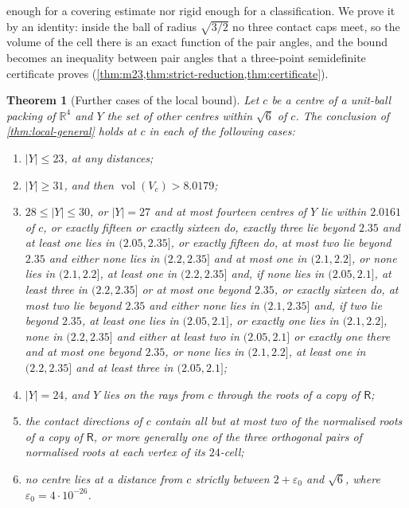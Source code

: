 \documentclass[11pt,reqno]{amsart}
\renewcommand{\_}{\origunderscore\allowbreak}
\numberwithin{equation}{section}
\theoremstyle{plain}
\newtheorem{thm}{Theorem}[section]
\theoremstyle{definition}
\theoremstyle{remark}
\newcommand{\Rt}{\mathsf{R}}                 %
\DeclareMathOperator{\vol}{vol}
\begin{document}
enough for a covering estimate nor rigid enough for a classification. We
prove it by an identity: inside the ball of radius $\sqrt{3/2}$ no three
contact caps meet, so the volume of the cell there is an exact function
of the pair angles, and the bound becomes an inequality between pair
angles that a three-point semidefinite certificate proves
(\cref{thm:m23,thm:strict-reduction,thm:certificate}).

\begin{thm}[Further cases of the local bound]\label{thm:intro-closure}
Let $c$ be a centre of a unit-ball packing of $\mathbb{R}^4$ and $Y$ the
set of other centres within $\sqrt6$ of $c$. The conclusion of
\cref{thm:local-general} holds at $c$ in each of the following cases:
\begin{enumerate}[label=\textup{(\alph*)},leftmargin=2.2em]
\item $|Y|\le23$, at any distances;
\item $|Y|\ge31$, and then $\vol(V_c)>8.0179$;
\item $28\le|Y|\le30$, or $|Y|=27$ and at most fourteen centres of $Y$ lie within
$2.0161$ of $c$, or exactly fifteen or exactly sixteen do, exactly three lie
beyond $2.35$ and at least one lies in $(2.05,2.35]$, or exactly fifteen
do, at most two lie beyond $2.35$ and either none lies in $(2.2,2.35]$ and at most one in $(2.1,2.2]$, or none lies in $(2.1,2.2]$, at least one in $(2.2,2.35]$ and, if none lies in $(2.05,2.1]$, at least three in $(2.2,2.35]$ or at most one beyond $2.35$,
or exactly sixteen do, at most two lie beyond $2.35$ and either none lies in $(2.1,2.35]$ and, if two lie beyond $2.35$, at least one lies in $(2.05,2.1]$, or exactly one lies in $(2.1,2.2]$, none in $(2.2,2.35]$ and either at least two in $(2.05,2.1]$ or exactly one there and at most one beyond $2.35$, or none lies in $(2.1,2.2]$, at least one in $(2.2,2.35]$ and at least three in $(2.05,2.1]$;
\item $|Y|=24$, and $Y$ lies on the rays from $c$ through the roots of a
copy of $\Rt$;
\item the contact directions of $c$ contain all but at most two of the
normalised roots of a copy of $\Rt$, or more generally one of the three
orthogonal pairs of normalised roots at each vertex of its $24$-cell;
\item no centre lies at a distance from $c$ strictly between
$2+\varepsilon_0$ and $\sqrt6$, where $\varepsilon_0=4\cdot10^{-26}$.
\end{enumerate}
\end{thm}
\end{document}
